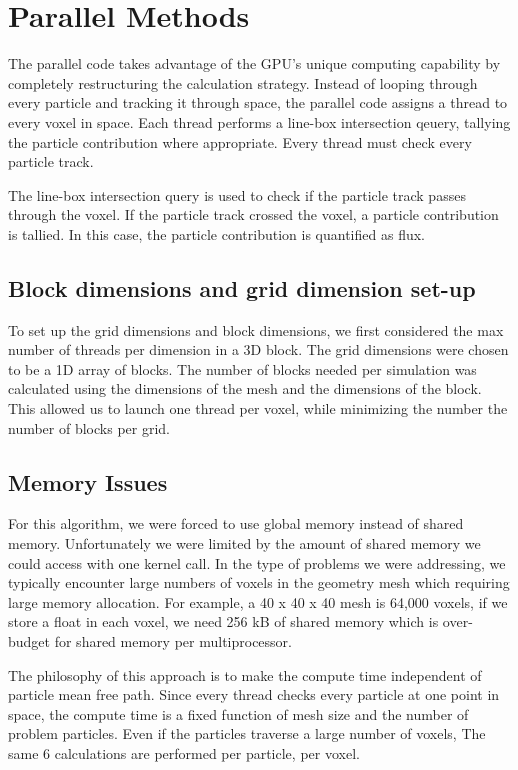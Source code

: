 \section{Parallel Methods}
The parallel code takes advantage of the GPU's unique computing capability by
completely restructuring the calculation strategy. Instead of looping through
every particle and tracking it through space, the parallel code assigns a thread
to every voxel in space. Each thread performs a line-box intersection qeuery,
tallying the particle contribution where appropriate\cite{ray_trace}. Every
thread must check every particle track. 

The line-box intersection query is used to check if the particle track passes 
through the voxel. If the particle track crossed the voxel, a particle contribution 
is tallied. In this case, the particle contribution is quantified as flux. 

\subsection{Block dimensions and grid dimension set-up}
To set up the grid dimensions and block dimensions, we first considered the max number of 
threads per dimension in a 3D block. 
The grid dimensions were chosen to be a 1D array of blocks. The number of blocks 
needed per simulation was calculated using the dimensions of the mesh and the 
dimensions of the block. This allowed us to launch one thread per voxel, while 
minimizing the number the number of blocks per grid. 

\subsection{Memory Issues}
For this algorithm, we were forced to use global memory instead of shared memory. 
Unfortunately we were limited by the amount of shared memory we 
could access with one kernel call. In the type of problems we were addressing, 
we typically encounter large numbers of voxels in the geometry mesh which
requiring 
large memory allocation. For example, a 40 x 40 x 40 mesh is 64,000 
voxels, if we store a float in each voxel, we need 
256 kB of shared memory which is over-budget for shared memory per multiprocessor.   

The philosophy of this approach is to make the compute time independent of
particle mean free path. Since every thread checks every particle at one point
in space, the compute time is a fixed function of mesh size and the number of
problem particles. Even if the particles traverse a large number of voxels, The
same 6 calculations are performed per particle, per voxel.

